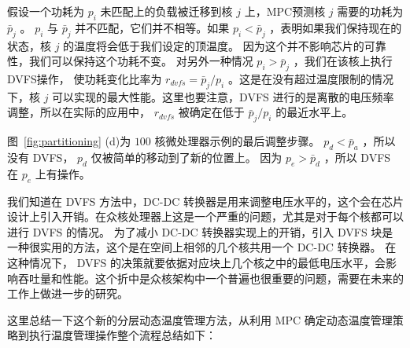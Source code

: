 假设一个功耗为 $p_i$ 未匹配上的负载被迁移到核 $j$ 上，MPC预测核 $j$ 需要的功耗为 $\bar{p}_j$ 。
$p_i$ 与 $\bar{p}_j$ 并不匹配，它们并不相等。如果 $p_i < \bar{p}_j$ ，表明如果我们保持现在的状态，核 $j$ 的温度将会低于我们设定的顶温度。
因为这个并不影响芯片的可靠性，我们可以保持这个功耗不变。
对另外一种情况 $p_i > \bar{p}_j$ ，我们在该核上执行DVFS操作，
使功耗变化比率为 $r_{dvfs} = \bar{p}_j/p_i$ 。这是在没有超过温度限制的情况下，核 $j$ 可以实现的最大性能。这里也要注意，DVFS 进行的是离散的电压频率调整，所以在实际的应用中， $r_{dvfs}$ 被确定在低于 $\bar{p}_j/p_i$ 的最近水平上。

图~\ref{fig:partitioning} (d)为 $100$ 核微处理器示例的最后调整步骤。
$p_d < \bar{p}_a$ ，所以没有 DVFS， $p_d$ 仅被简单的移动到了新的位置上。
因为 $p_e>\bar{p}_d $ ，所以 DVFS 在 $p_e$ 上有操作。

我们知道在 DVFS 方法中，DC-DC 转换器是用来调整电压水平的，这个会在芯片设计上引入开销。在众核处理器上这是一个严重的问题，尤其是对于每个核都可以进行 DVFS 的情况。
为了减小 DC-DC 转换器实现上的开销，引入 DVFS 块是一种很实用的方法，这个是在空间上相邻的几个核共用一个 DC-DC 转换器。
在这种情况下， DVFS 的决策就要依据对应块上几个核之中的最低电压水平，会影响吞吐量和性能。这个折中是众核架构中一个普遍也很重要的问题，需要在未来的工作上做进一步的研究。

这里总结一下这个新的分层动态温度管理方法，从利用 MPC 确定动态温度管理策略到执行温度管理操作整个流程总结如下：

